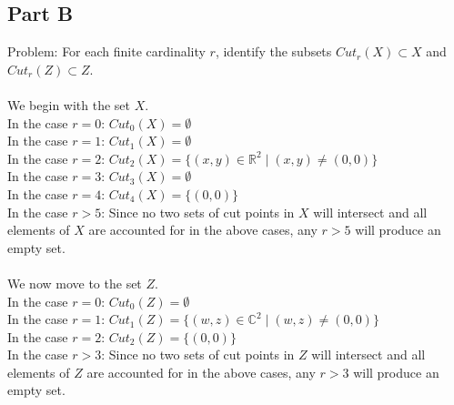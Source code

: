 \documentclass{article}
\begin{document}
\subsection*{Part B}
Problem: For each finite cardinality $r$, identify the subsets
$Cut_r(X) \subset X$ and $Cut_r(Z) \subset Z$. \\\\
We begin with the set $X$. \\
In the case $r = 0$: $Cut_0(X) = \emptyset$ \\
In the case $r = 1$: $Cut_1(X) = \emptyset$ \\
In the case $r = 2$: $Cut_2(X) = \{ (x,y) \in \mathbb{R}^2 \mid (x,y) \neq (0,0) \} $ \\
In the case $r = 3$: $Cut_3(X) = \emptyset$ \\
In the case $r = 4$: $Cut_4(X) = \{ (0,0) \}$ \\
In the case $r > 5$: Since no two sets of cut points in $X$ will intersect and all elements of $X$ are accounted for in the above cases, any $r > 5$ will produce an empty set. \\\\
We now move to the set $Z$. \\
In the case $r = 0$: $Cut_0(Z) = \emptyset$ \\
In the case $r = 1$: $Cut_1(Z) = \{ (w,z) \in \mathbb{C}^2 \mid (w,z) \neq (0,0) \} $ \\
In the case $r = 2$: $Cut_2(Z) = \{ (0,0) \} $ \\
In the case $r > 3$: Since no two sets of cut points in $Z$ will intersect and all elements of $Z$ are accounted for in the above cases, any $r > 3$ will produce an empty set.

\newpage
\end{document}
